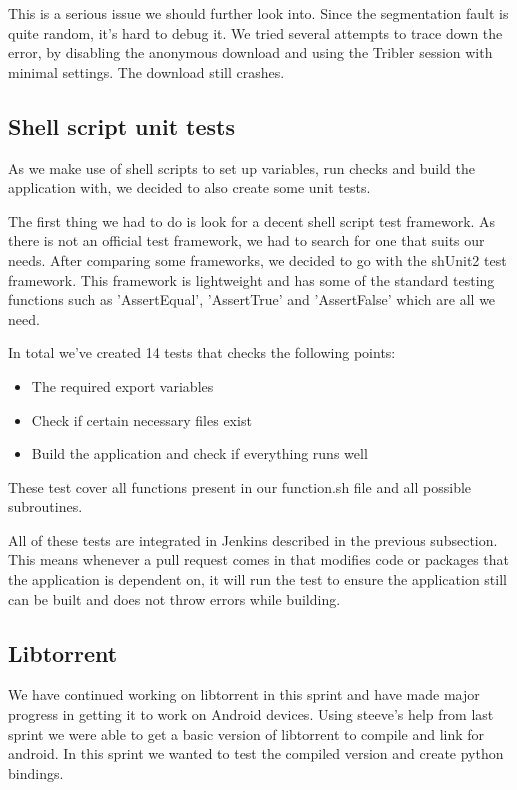	This is a serious issue we should further look into. Since the segmentation fault is quite random, it's hard to debug it. We tried several attempts to trace down the error, by disabling the anonymous download and using the Tribler session with minimal settings. The download still crashes.

	\subsection{Shell script unit tests}
		As we make use of shell scripts to set up variables, run checks and build the application with, we decided to also create some unit tests.
		
		The first thing we had to do is look for a decent shell script test framework. As there is not an official test framework, we had to search for one that suits our needs. After comparing some frameworks, we decided to go with the shUnit2 test framework. This framework is lightweight and has some of the standard testing functions such as 'AssertEqual', 'AssertTrue' and 'AssertFalse' which are all we need. 
		
		In total we've created 14 tests that checks the following points:
		
		\begin{itemize}
			\item The required export variables
			\item Check if certain necessary files exist
			\item Build the application and check if everything runs well
		\end{itemize}
		
		These test cover all functions present in our function.sh file and all possible subroutines. 
		
		All of these tests are integrated in Jenkins described in the previous subsection. This means whenever a pull request comes in that modifies code or packages that the application is dependent on, it will run the test to ensure the application still can be built and does not throw errors while building.
	
	\subsection{Libtorrent}
		We have continued working on libtorrent in this sprint and have made major progress in getting it to work on Android devices. Using steeve's help from last sprint we were able to get a basic version of libtorrent to compile and link for android. In this sprint we wanted to test the compiled version and create python bindings.
		

